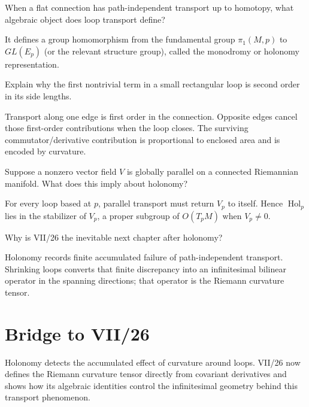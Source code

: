 \begin{problem}\label{prob:vii25-ch02}
When a flat connection has path-independent transport up to homotopy, what algebraic object does loop transport define?
\end{problem}
\begin{solution}
It defines a group homomorphism from the fundamental group \(\pi_1(M,p)\) to \(GL(E_p)\) (or the relevant structure group), called the monodromy or holonomy representation.
\end{solution}


\begin{problem}\label{prob:vii25-ch03}
Explain why the first nontrivial term in a small rectangular loop is second order in its side lengths.
\end{problem}
\begin{solution}
Transport along one edge is first order in the connection. Opposite edges cancel those first-order contributions when the loop closes. The surviving commutator/derivative contribution is proportional to enclosed area and is encoded by curvature.
\end{solution}


\begin{problem}\label{prob:vii25-ch04}
Suppose a nonzero vector field \(V\) is globally parallel on a connected Riemannian manifold. What does this imply about holonomy?
\end{problem}
\begin{solution}
For every loop based at \(p\), parallel transport must return \(V_p\) to itself. Hence \(\operatorname{Hol}_p\) lies in the stabilizer of \(V_p\), a proper subgroup of \(O(T_pM)\) when \(V_p\neq0\).
\end{solution}


\begin{problem}\label{prob:vii25-ch05}
Why is VII/26 the inevitable next chapter after holonomy?
\end{problem}
\begin{solution}
Holonomy records finite accumulated failure of path-independent transport. Shrinking loops converts that finite discrepancy into an infinitesimal bilinear operator in the spanning directions; that operator is the Riemann curvature tensor.
\end{solution}

\section*{Bridge to VII/26}
Holonomy detects the accumulated effect of curvature around loops.  VII/26 now
defines the Riemann curvature tensor directly from covariant derivatives and shows
how its algebraic identities control the infinitesimal geometry behind this
transport phenomenon.

